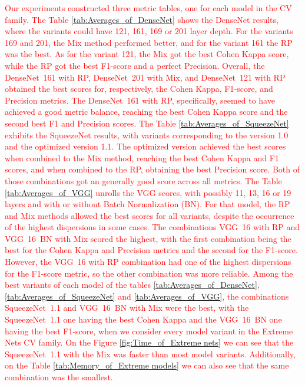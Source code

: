 \textcolor{red}{
Our experiments constructed three metric tables, one for each model in the \gls{CV} family.
The Table \ref{tab:Averages_of_DenseNet} shows the DenseNet results, where the variants could have 121, 161, 169 or 201 layer depth. For the variants 169 and 201, the \gls{Mix} method performed better, and for the variant 161 the \gls{RP} was the best. As for the variant 121, the \gls{Mix} got the best Cohen Kappa score, while the \gls{RP} got the best F1-score and a perfect Precision. Overall, the \mbox{DenseNet 161} with \gls{RP}, \mbox{DenseNet 201} with \gls{Mix}, and \mbox{DenseNet 121} with \gls{RP} obtained the best scores for, respectively, the Cohen Kappa, F1-score, and Precision metrics. The \mbox{DenseNet 161} with \gls{RP}, specifically, seemed to have achieved a good metric balance, reaching the best Cohen Kappa score and the second best F1 and Precision scores.    
The Table \ref{tab:Averages_of_SqueezeNet} exhibits the SqueezeNet results, with variants corresponding to the version 1.0 and the optimized version 1.1. The optimized version achieved the best scores when combined to the \gls{Mix} method, reaching the best Cohen Kappa and F1 scores, and when combined to the \gls{RP}, obtaining the best Precision score. Both of those combinations got an generally good score across all metrics. 
The Table \ref{tab:Averages_of_VGG} unrolls the VGG scores, with possibly 11, 13, 16 or 19 layers and with or without Batch Normalization (BN). For that model, the \gls{RP} and \gls{Mix} methods allowed the best scores for all variants, despite the occurrence of the highest dispersions in some cases. The combinations \mbox{VGG 16} with \gls{RP} and \mbox{VGG 16 BN} with \gls{Mix} scored the highest, with the first combination being the best for the Cohen Kappa and Precision metrics and the second for the F1-score. However, the \mbox{VGG 16} with \gls{RP} combination had one of the highest dispersions for the F1-score metric, so the other combination was more reliable.   
Among the best variants of each model of the tables \ref{tab:Averages_of_DenseNet}, \ref{tab:Averages_of_SqueezeNet} and \ref{tab:Averages_of_VGG}, the combinations \mbox{SqueezeNet 1.1} and \mbox{VGG 16 BN} with \gls{Mix} were the best, with the \mbox{SqueezeNet 1.1} one having the best Cohen Kappa and the \mbox{VGG 16 BN} one having the best F1-score, when we consider every model variant in the Extreme Nets \gls{CV} family. On the Figure \ref{fig:Time_of_Extreme nets} we can see that the \mbox{SqueezeNet 1.1} with the \gls{Mix} was faster than most model variants. Additionally, on the Table \ref{tab:Memory_of_Extreme models} we can also see that the same combination was the smallest.
}

